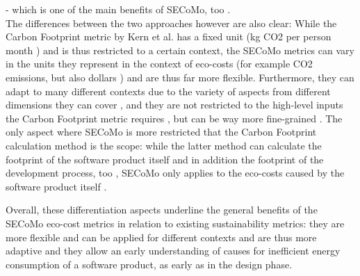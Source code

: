 \cite{kern_impacts_2015} - which is one of the main benefits of SECoMo, too \cite{schulze_cost_2016}.\\ %
The differences between the two approaches however are also clear: While the Carbon Footprint metric by Kern et al. has a fixed unit (kg CO2 per person month \cite{kern_impacts_2015}) and is thus restricted to a certain context, the SECoMo metrics can vary in the units they represent in the context of eco-costs (for example CO2 %
 emissions, but also dollars \cite{schulze_cost_2016}) and are thus far more flexible. Furthermore, they can adapt to many different contexts due to the variety of aspects from different dimensions they can cover \cite{schulze_cost_2016}, and they are not restricted to the high-level inputs the Carbon Footprint metric requires \cite{kern_impacts_2015}, but can be way more fine-grained \cite{schulze_cost_2016}. The only aspect where SECoMo is more restricted that the Carbon Footprint calculation method is the scope: while the latter method can calculate the footprint of the software product itself and in addition the footprint of the development process, too \cite{kern_impacts_2015}, SECoMo only applies to the eco-costs caused by the software product itself \cite{schulze_cost_2016}. %

Overall, these differentiation aspects underline the general benefits of the SECoMo eco-cost metrics in relation to existing sustainability metrics: they are more flexible and can be applied for different contexts and are  thus more adaptive and they allow an early understanding of causes for inefficient energy consumption of a software product, as early as in the design phase. %


